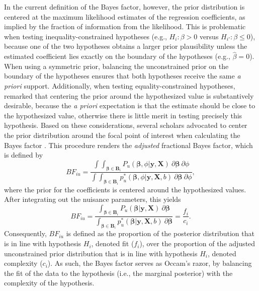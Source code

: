 \documentclass[
]{article}
\begin{document}
In the current definition of the Bayes factor, however, the prior
distribution is centered at the maximum likelihood estimates of the
regression coefficients, as implied by the fraction of information from
the likelihood. This is problematic when testing inequality-constrained
hypotheses (e.g., \(H_i: \beta > 0\) versus \(H_{i'}: \beta \leq 0\)),
because one of the two hypotheses obtains a larger prior plausibility
unless the estimated coefficient lies exactly on the boundary of the
hypotheses (e.g., \(\hat{\beta}=0\)). When using a symmetric prior,
balancing the unconstrained prior on the boundary of the hypotheses
ensures that both hypotheses receive the same \emph{a priori} support.
Additionally, when testing equality-constrained hypotheses,
\citet{jeffreys_1961} remarked that centering the prior around the
hypothesized value is substantively desirable, because the \emph{a
priori} expectation is that the estimate should be close to the
hypothesized value, otherwise there is little merit in testing precisely
this hypothesis. Based on these considerations, several scholars
advocated to center the prior distribution around the focal point of
interest when calculating the Bayes factor
\citep{gu_approximated_2018, mulder_prior_2014, zellner_siow_1980, mulder_gu_bayesian_2021}.
This procedure renders the \emph{adjusted} fractional Bayes factor,
which is defined by \[
BF_{iu} = \frac{
  \int \int_{\boldsymbol{\beta} \in \boldsymbol{B}_i} P_u(\boldsymbol{\beta}, \phi | \boldsymbol{y}, \boldsymbol{X}) ~ \partial \boldsymbol{\beta} ~ \partial \phi
} {
  \int \int_{\boldsymbol{\beta} \in \boldsymbol{B}_i} p^*_u(\boldsymbol{\beta}, \phi| \boldsymbol{y}, \boldsymbol{X}, b) ~ \partial \boldsymbol{\beta} ~ \partial \phi
},
\] where the prior for the coefficients is centered around the
hypothesized values. After integrating out the nuisance parameters, this
yields \[
BF_{iu} = \frac{
  \int_{\boldsymbol{\beta} \in \boldsymbol{B}_i} P_u (\boldsymbol{\beta} | \boldsymbol{y}, \boldsymbol{X}) ~ \partial \boldsymbol{\beta}
}{
  \int_{\boldsymbol{\beta} \in \boldsymbol{B}_i} p^*_u(\boldsymbol{\beta} | \boldsymbol{y}, \boldsymbol{X}, b) ~ \partial \boldsymbol{\beta}
}
= \frac{f_i}{c_i}.
\] Consequently, \(BF_{iu}\) is defined as the proportion of the
posterior distribution that is in line with hypothesis \(H_i\), denoted
fit (\(f_i\)), over the proportion of the adjusted unconstrained prior
distribution that is in line with hypothesis \(H_i\), denoted complexity
(\(c_i\)). As such, the Bayes factor serves as Occam's razor, by
balancing the fit of the data to the hypothesis (i.e., the marginal
posterior) with the complexity of the hypothesis.
\end{document}
